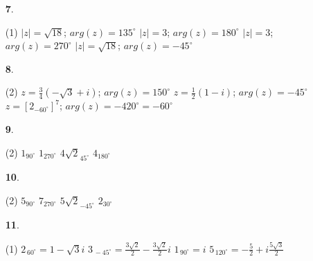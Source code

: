 \documentclass[a4paper, pdf, twoside]{book}
\begin{document}
\begin{multicols}{2}
\begin{enumerate}
 \item[\fontfamily{phv}\selectfont\color{blue}\textbf{7}. ] 
 \begin{tasks}[column-sep=1em, item-indent=1.3333em](1)
	 \task* $|z|=\sqrt {18}$; $arg(z)=135^\circ $
	 \task $|z|=3$; $arg(z)=180^\circ $
	 \task $|z|=3$; $arg(z)=270^\circ $
	 \task* $|z|=\sqrt {18}$; $arg(z)=-45^\circ $
\end{tasks}
 \end{enumerate}
\begin{enumerate}
\vspace{0.25cm}



 \item[\fontfamily{phv}\selectfont\color{blue}\textbf{8}. ] 
 \begin{tasks}[column-sep=1em, item-indent=1.3333em](2)
	 \task* $z=\frac {3}{4}(-\sqrt {3}+i)$; $arg(z)=150^\circ $
	 \task* $z=\frac {1}{2}(1-i)$; $arg(z)=-45^\circ $
	 \task* $z=\left [2_{-60^\circ }\right ]^7$; $arg(z)=-420^\circ =-60^\circ $
\end{tasks}
\vspace{0.25cm}



 \item[\fontfamily{phv}\selectfont\color{blue}\textbf{9}. ] 
 \begin{tasks}[column-sep=1em, item-indent=1.3333em](2)
	 \task $1_{90^\circ }$
	 \task $1_{270^\circ }$
	 \task $4\sqrt {2}_{45^\circ }$
	 \task $4_{180^\circ }$
\end{tasks}
\vspace{0.25cm}



 \item[\fontfamily{phv}\selectfont\color{blue}\textbf{10}. ] 
 \begin{tasks}[column-sep=1em, item-indent=1.3333em](2)
	 \task $5_{90^\circ }$
	 \task $7_{270^\circ }$
	 \task $5\sqrt {2}_{-45^\circ }$
	 \task $2_{30^\circ }$
\end{tasks}
\vspace{0.25cm}



 \item[\fontfamily{phv}\selectfont\color{blue}\textbf{11}. ]  \scalebox{0.6}{\simbolclau } 
 \begin{tasks}[column-sep=1em, item-indent=1.3333em](1)
	 \task*  $2_{\,60^\circ }= 1 - \sqrt {3} i$
	 \task* $3_{\,-45^\circ }= \frac {3\sqrt {2}}{2} - \frac {3\sqrt {2}}{2} i$
	 \task $1_{\,90^\circ }= i $
	 \task* $5_{\,120^\circ }= -\frac {5}{2} + i \frac {5\sqrt {3}}{2}$
\end{tasks}
 \end{enumerate}
\vspace{0.3cm}


\end{multicols}
\end{document}
